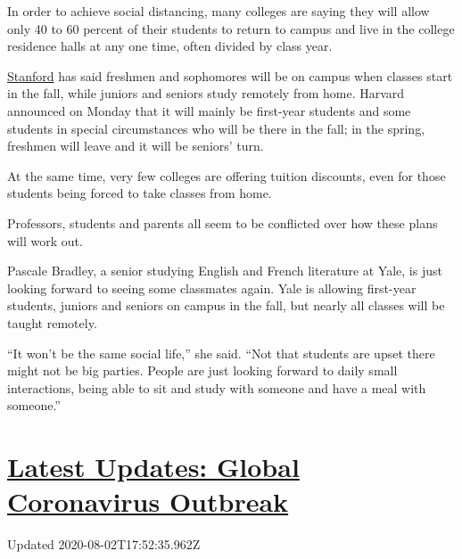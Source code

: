 In order to achieve social distancing, many colleges are saying they
will allow only 40 to 60 percent of their students to return to campus
and live in the college residence halls at any one time, often divided
by class year.

\href{https://www.nytimes.com/2020/07/08/sports/coronavirus-stanford-cuts.html}{Stanford}
has said freshmen and sophomores will be on campus when classes start in
the fall, while juniors and seniors study remotely from home. Harvard
announced on Monday that it will mainly be first-year students and some
students in special circumstances who will be there in the fall; in the
spring, freshmen will leave and it will be seniors' turn.

At the same time, very few colleges are offering tuition discounts, even
for those students being forced to take classes from home.

Professors, students and parents all seem to be conflicted over how
these plans will work out.

Pascale Bradley, a senior studying English and French literature at
Yale, is just looking forward to seeing some classmates again. Yale is
allowing first-year students, juniors and seniors on campus in the fall,
but nearly all classes will be taught remotely.

``It won't be the same social life,'' she said. ``Not that students are
upset there might not be big parties. People are just looking forward to
daily small interactions, being able to sit and study with someone and
have a meal with someone.''

\hypertarget{latest-updates-global-coronavirus-outbreak}{%
\section{\texorpdfstring{\href{https://www.nytimes.com/2020/08/01/world/coronavirus-covid-19.html?action=click\&pgtype=Article\&state=default\&region=MAIN_CONTENT_1\&context=storylines_live_updates}{Latest
Updates: Global Coronavirus
Outbreak}}{Latest Updates: Global Coronavirus Outbreak}}\label{latest-updates-global-coronavirus-outbreak}}

Updated 2020-08-02T17:52:35.962Z

